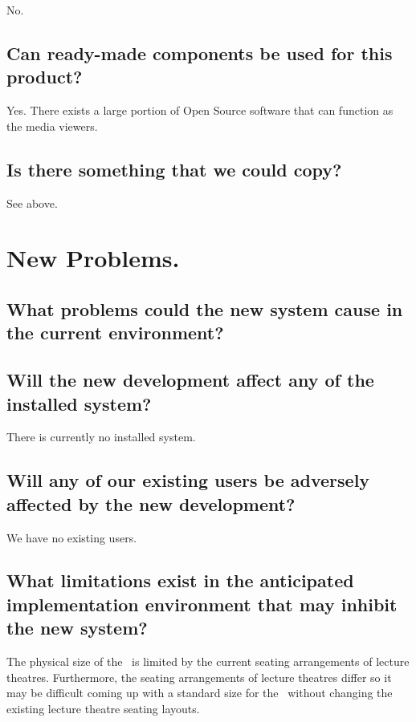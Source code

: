 No.

\subsection{Can ready-made components be used for this product?}

Yes. There exists a large portion of Open Source software that can function as the media viewers.

\subsection{Is there something that we could copy?}

See above.

\section{New Problems.}

\subsection{What problems could the new system cause in the current environment?}

\subsection{Will the new development affect any of the installed system?}

There is currently no installed system.

\subsection{Will any of our existing users be adversely affected by the new development?}

We have no existing users.

\subsection{What limitations exist in the anticipated implementation environment that may inhibit the new system?}

The physical size of the \iDesk\ is limited by the current seating arrangements of lecture theatres. Furthermore, the seating arrangements of lecture theatres differ so it may be difficult coming up with a standard size for the \iDesk\ without changing the existing lecture theatre seating layouts.

